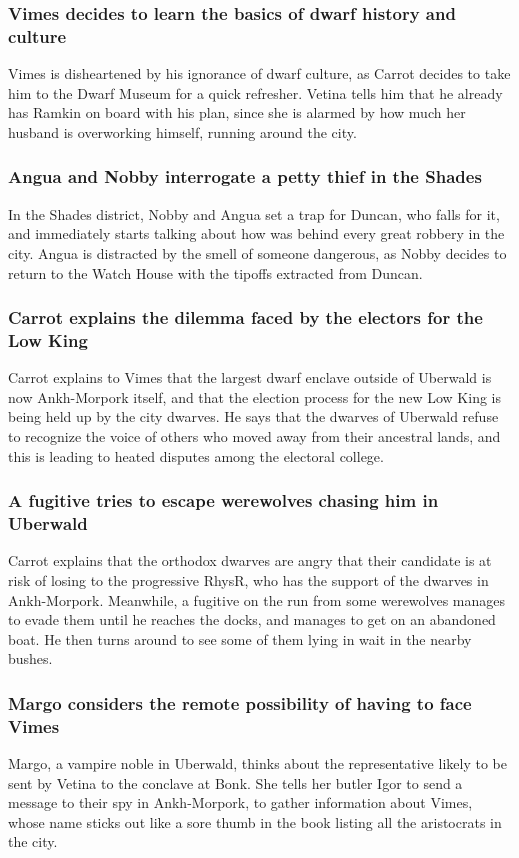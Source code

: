 \subsubsection{\Gls{Vimes} decides to learn the basics of dwarf history and culture}
\Gls{Vimes} is disheartened by his ignorance of dwarf culture, as \Gls{Carrot} decides to take him
to the Dwarf Museum for a quick refresher. \Gls{Vetina} tells him that he already has \Gls{Ramkin}
on board with his plan, since she is alarmed by how much her husband is overworking himself,
running around the city.

\subsubsection{\Gls{Angua} and \Gls{Nobby} interrogate a petty thief in the Shades}
In the Shades district, \Gls{Nobby} and \Gls{Angua} set a trap for \Gls{Duncan}, who falls for it,
and immediately starts talking about how was behind every great robbery in the city. \Gls{Angua}
is distracted by the smell of someone dangerous, as \Gls{Nobby} decides to return to the Watch
House with the tipoffs extracted from \Gls{Duncan}.

\subsubsection{\Gls{Carrot} explains the dilemma faced by the electors for the Low King}
\Gls{Carrot} explains to \Gls{Vimes} that the largest dwarf enclave outside of Uberwald is now
Ankh-Morpork itself, and that the election process for the new Low King is being held up by the
city dwarves. He says that the dwarves of Uberwald refuse to recognize the voice of others who
moved away from their ancestral lands, and this is leading to heated disputes among the electoral
college.

\subsubsection{A fugitive tries to escape werewolves chasing him in Uberwald}
\Gls{Carrot} explains that the orthodox dwarves are angry that their candidate is at risk of losing
to the progressive \Gls{RhysR}, who has the support of the dwarves in Ankh-Morpork. Meanwhile,
a fugitive on the run from some werewolves manages to evade them until he reaches the docks, and
manages to get on an abandoned boat. He then turns around to see some of them lying in wait in the
nearby bushes.

\subsubsection{\Gls{Margo} considers the remote possibility of having to face \Gls{Vimes}}
\Gls{Margo}, a vampire noble in Uberwald, thinks about the representative likely to be sent by
\Gls{Vetina} to the conclave at Bonk. She tells her butler \Gls{Igor} to send a message to their
spy in Ankh-Morpork, to gather information about \Gls{Vimes}, whose name sticks out like a sore
thumb in the book listing all the aristocrats in the city.

